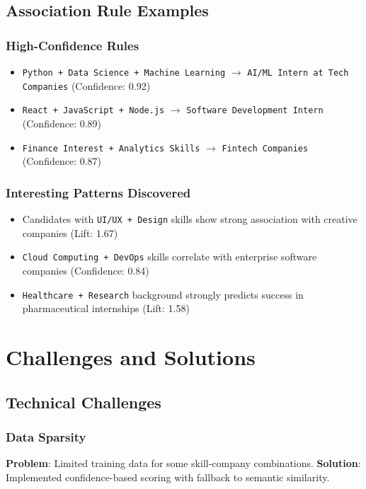 \documentclass[12pt,a4paper]{article}
\begin{document}
\subsection{Association Rule Examples}

\subsubsection{High-Confidence Rules}
\begin{itemize}
    \item \texttt{Python + Data Science + Machine Learning} $\rightarrow$ \texttt{AI/ML Intern at Tech Companies} (Confidence: 0.92)
    \item \texttt{React + JavaScript + Node.js} $\rightarrow$ \texttt{Software Development Intern} (Confidence: 0.89)
    \item \texttt{Finance Interest + Analytics Skills} $\rightarrow$ \texttt{Fintech Companies} (Confidence: 0.87)
\end{itemize}

\subsubsection{Interesting Patterns Discovered}
\begin{itemize}
    \item Candidates with \texttt{UI/UX + Design} skills show strong association with creative companies (Lift: 1.67)
    \item \texttt{Cloud Computing + DevOps} skills correlate with enterprise software companies (Confidence: 0.84)
    \item \texttt{Healthcare + Research} background strongly predicts success in pharmaceutical internships (Lift: 1.58)
\end{itemize}

\section{Challenges and Solutions}

\subsection{Technical Challenges}

\subsubsection{Data Sparsity}
\textbf{Problem}: Limited training data for some skill-company combinations.
\textbf{Solution}: Implemented confidence-based scoring with fallback to semantic similarity.
\end{document}
